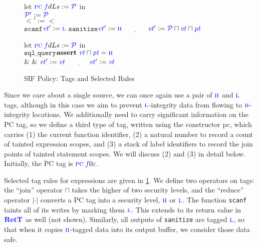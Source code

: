 \documentclass{llncs}
\begin{document}
\begin{table}[t]
\begin{figure}
  \begin{minipage}{0.54\textwidth}
    \storetruleblock
        {let \(\textnormal{\sc \color{blue} pc} \mathit{\color{blue} ~ f}{d}{Ls} := \mathcal{\color{blue} P\mathit{}}\) in \\
          \(\mathcal{\color{blue} P\mathit{}}' := \mathcal{\color{blue} P\mathit{}}\) \\
          \(\lt' := \lt\) \\
                      {\(\mathtt{scanf}\)}{\(\mathit{\color{blue} vt}':=\textnormal{\color{blue} \sc l}\)}
                      {\(\mathtt{sanitize}\)}{\(\mathit{\color{blue} vt}':=\textnormal{\color{blue} \sc h}\)}
                      {\(\underline{\hspace{3em}}\)}
                      {\(\mathit{\color{blue} vt}' := \mathcal{\color{blue} P\mathit{}} \sqcap \mathit{\color{blue} vt} \sqcap \mathit{\color{blue} pt}\)}}
  \end{minipage}
  \begin{minipage}{0.45\textwidth}
    \loadtruleblock
        {let \(\textnormal{\sc \color{blue} pc} \mathit{\color{blue} ~ f}{d}{Ls} := \mathcal{\color{blue} P\mathit{}}\) in \\
                    {\(\mathtt{sql\_query}\)}{\(\mathbf{assert} ~ \mathit{\color{blue} vt} \sqcap \mathit{\color{blue} pt} = \textnormal{\color{blue} \sc h}\) \\ & & \(\mathit{\color{blue} vt}' := \mathit{\color{blue} vt}\)}
                    {\(\underline{\hspace{3em}}\)}{\(\mathit{\color{blue} vt}' := \mathit{\color{blue} vt}\)}}

  \end{minipage}

\caption{SIF Policy: Tags and Selected Rules}
\label{fig:sif1}
\end{figure}

Since we care about a single source, we can once again use a pair of \(\textnormal{\color{blue} \sc h}\)
and \(\textnormal{\color{blue} \sc l}\) tags, although in this case we aim to prevent \(\textnormal{\color{blue} \sc l}\)-integrity
data from flowing to \(\textnormal{\color{blue} \sc h}\)-integrity locations.
We additionally need to carry significant information on the PC tag,
so we define a third type of tag, written using the constructor {\sc \color{blue} pc},
which carries (1) the current function identifier, (2) a natural number to record
a count of tainted expression scopes, and (3) a stack of label identifiers to record
the join points of tainted statement scopes. We will discuss (2) and (3) in detail below.
Initially, the PC tag is \(\textnormal{\sc \color{blue} pc} \mathit{\color{blue} ~ f}{0}{\varepsilon}\).

Selected tag rules for expressions are given in \cref{fig:sif1}. We define two operators on tags:
the ``join'' operator \(\sqcap\) takes the higher of two security levels, and the ``reduce''
operator \(| \cdot |\) converts a PC tag into a security level, \(\textnormal{\color{blue} \sc h}\) or \(\textnormal{\color{blue} \sc l}\).
The function {\tt scanf} taints all of its writes by marking them \(\textnormal{\color{blue} \sc l}\).  This extends to
its return value in \(\color{blue} \mathbf{RetT}\) as well (not shown).
Similarly, all outputs of {\tt sanitize} are tagged \(\textnormal{\color{blue} \sc l}\), so that when it copies \(\textnormal{\color{blue} \sc h}\)-tagged data into its
output buffer, we consider those data safe.


\end{table}
\end{document}
